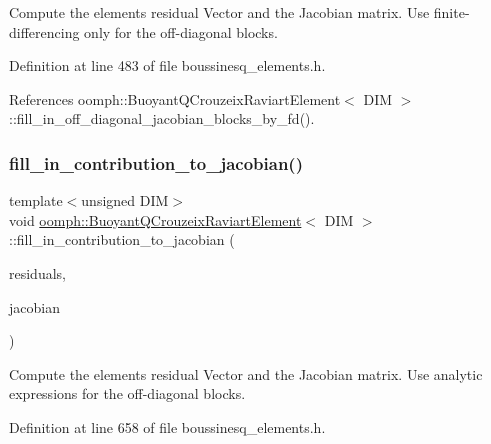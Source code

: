 Compute the element\textquotesingle{}s residual Vector and the Jacobian matrix. Use finite-\/differencing only for the off-\/diagonal blocks. 



Definition at line 483 of file boussinesq\+\_\+elements.\+h.



References oomph\+::\+Buoyant\+Q\+Crouzeix\+Raviart\+Element$<$ D\+I\+M $>$\+::fill\+\_\+in\+\_\+off\+\_\+diagonal\+\_\+jacobian\+\_\+blocks\+\_\+by\+\_\+fd().

\mbox{\label{classoomph_1_1BuoyantQCrouzeixRaviartElement_a7bd9313dd697c1219cee4a65692388b5}} 
\subsubsection{\texorpdfstring{fill\+\_\+in\+\_\+contribution\+\_\+to\+\_\+jacobian()}{fill\_in\_contribution\_to\_jacobian()}\hspace{0.1cm}{\footnotesize\ttfamily [3/3]}}
{\footnotesize\ttfamily template$<$unsigned D\+IM$>$ \\
void \hyperlink{classoomph_1_1BuoyantQCrouzeixRaviartElement}{oomph\+::\+Buoyant\+Q\+Crouzeix\+Raviart\+Element}$<$ D\+IM $>$\+::fill\+\_\+in\+\_\+contribution\+\_\+to\+\_\+jacobian (\begin{DoxyParamCaption}\item[{Vector$<$ double $>$ \&}]{residuals,  }\item[{Dense\+Matrix$<$ double $>$ \&}]{jacobian }\end{DoxyParamCaption})\hspace{0.3cm}{\ttfamily [inline]}}



Compute the element\textquotesingle{}s residual Vector and the Jacobian matrix. Use analytic expressions for the off-\/diagonal blocks. 



Definition at line 658 of file boussinesq\+\_\+elements.\+h.



